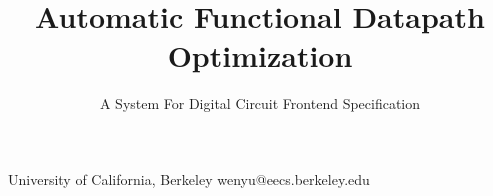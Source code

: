 \documentclass[10pt,nocopyrightspace]{sigplanconf}
\begin{document}
\preprintfooter{}   %

\title{Automatic Functional Datapath Optimization}
\subtitle{A System For Digital Circuit Frontend Specification}

           {University of California, Berkeley}
           {wenyu@eecs.berkeley.edu}

\maketitle


\tableofcontents
\setcounter{tocdepth}{2}









\clearpage

\setlength{\bibsep}{0.0pt}
\renewcommand*{\bibfont}{\footnotesize}

\end{document}
